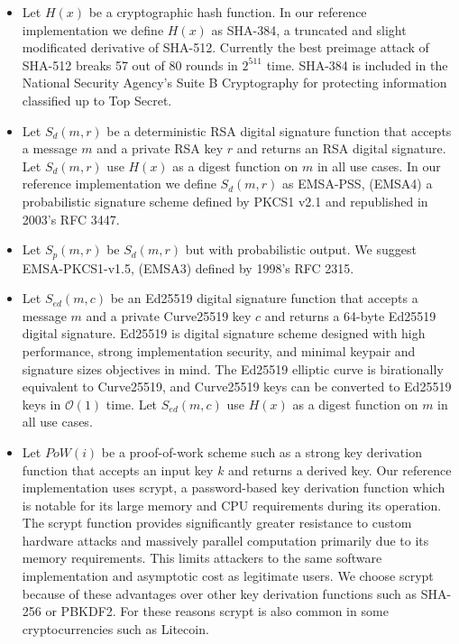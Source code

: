 \begin{itemize}
	\item Let $ H(x) $ be a cryptographic hash function. In our reference implementation we define $ H(x) $ as SHA-384, a truncated and slight modificated derivative of SHA-512. Currently the best preimage attack of SHA-512 breaks 57 out of 80 rounds in $ 2^{511} $ time.\cite{li2012converting} SHA-384 is included in the National Security Agency's Suite B Cryptography for protecting information classified up to Top Secret.
	\item Let $ S_{d}(m, r) $ be a deterministic RSA digital signature function that accepts a message $ m $ and a private RSA key $ r $ and returns an RSA digital signature. Let $ S_{d}(m, r) $ use $ H(x) $ as a digest function on $ m $ in all use cases. In our reference implementation we define $ S_{d}(m, r) $ as EMSA-PSS, (EMSA4) a probabilistic signature scheme defined by PKCS1 v2.1 and republished in 2003's RFC 3447.
	\item Let $ S_{p}(m, r) $ be $ S_{d}(m, r) $ but with probabilistic output. We suggest EMSA-PKCS1-v1.5, (EMSA3) defined by 1998's RFC 2315.
	\item Let $ S_{\mathit{ed}}(m, c) $ be an Ed25519 digital signature function that accepts a message $ m $ and a private Curve25519 key $ c $ and returns a 64-byte Ed25519 digital signature. Ed25519 is digital signature scheme designed with high performance, strong implementation security, and minimal keypair and signature sizes objectives in mind. The Ed25519 elliptic curve is birationally equivalent to Curve25519, and Curve25519 keys can be converted to Ed25519 keys in $ \mathcal{O}(1) $ time.\cite{bernstein2011high} Let $ S_{\mathit{ed}}(m, c) $ use $ H(x) $ as a digest function on $ m $ in all use cases.
	\item Let $ \mathit{PoW}(i) $ be a proof-of-work scheme such as a strong key derivation function that accepts an input key $ k $ and returns a derived key. Our reference implementation uses scrypt, a password-based key derivation function which is notable for its large memory and CPU requirements during its operation. The scrypt function provides significantly greater resistance to custom hardware attacks and massively parallel computation primarily due to its memory requirements. This limits attackers to the same software implementation and asymptotic cost as legitimate users.\cite{percival2009stronger}\cite{percival2012scrypt} We choose scrypt because of these advantages over other key derivation functions such as SHA-256 or PBKDF2. For these reasons scrypt is also common in some cryptocurrencies such as Litecoin.

\end{itemize}
